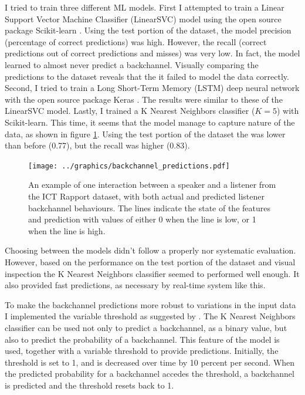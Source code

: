 \documentclass[]{simple-thesis}
\begin{document}
I tried to train three different ML models.
First I attempted to train a Linear Support Vector Machine Classifier (LinearSVC) model using the open source package Scikit-learn \citep{Pedregosa2011}.
Using the test portion of the dataset, the model precision (percentage of correct predictions) was high.
However, the recall (correct predictions out of correct predictions and misses) was very low.
In fact, the model learned to almost never predict a backchannel.
Visually comparing the predictions to the dataset reveals that the it failed to model the data correctly.
Second, I tried to train a Long Short-Term Memory (LSTM) deep neural network with the open source package Keras \citep{Chollet2015}.
The results were similar to these of the LinearSVC model.
Lastly, I trained a K Nearest Neighbors classifier ($K = 5$) with Scikit-learn.
This time, it seems that the model manage to capture nature of the data, as shown in figure \ref{fig:system:backchannel_predictions}.
Using the test portion of the dataset the was lower than before (0.77), but the recall was higher (0.83).

\begin{figure}
  \texttt{[image: ../graphics/backchannel\_predictions.pdf]}
  \caption{An example of one interaction between a speaker and a listener from the ICT Rapport dataset, with both actual and predicted listener backchannel behaviours. The lines indicate the state of the features and prediction with values of either 0 when the line is low, or 1 when the line is high.}
  \label{fig:system:backchannel_predictions}
\end{figure}

Choosing between the models didn't follow a properly nor systematic evaluation.
However, based on the performance on the test portion of the dataset and visual inspection the K Nearest Neighbors classifier seemed to performed well enough.
It also provided fast predictions, as necessary by real-time system like this.

To make the backchannel predictions more robust to variations in the input data I implemented the variable threshold as suggested by \cite{Kok2012}.
The K Nearest Neighbors classifier can be used not only to predict a backchannel, as a binary value, but also to predict the probability of a backchannel.
This feature of the model is used, together with a variable threshold to provide predictions.
Initially, the threshold is set to 1, and is decreased over time by 10 percent per second.
When the predicted probability for a backchannel accedes the threshold, a backchannel is predicted and the threshold resets back to 1.
\end{document}
